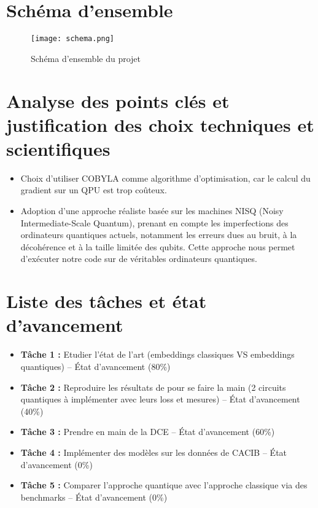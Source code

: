 \documentclass[11pt,a4paper]{article}
\begin{document}
\section{Schéma d'ensemble}
\begin{figure}[h!]
    \centering
    \texttt{[image: schema.png]}
    \caption{Schéma d'ensemble du projet}
    \label{fig:schema}
\end{figure}

\section{Analyse des points clés et justification des choix techniques et scientifiques}

\begin{itemize}
    \item Choix d’utiliser COBYLA comme algorithme d’optimisation, car le calcul du gradient sur un QPU est trop coûteux.
    \item Adoption d'une approche réaliste basée sur les machines NISQ (Noisy Intermediate-Scale Quantum), prenant en compte les imperfections des ordinateurs quantiques actuels, notamment les erreurs dues au bruit, à la décohérence et à la taille limitée des qubits. Cette approche nous permet d'exécuter notre code sur de véritables ordinateurs quantiques.
\end{itemize}

\section{Liste des tâches et état d'avancement}

\begin{itemize}
    \item \textbf{Tâche 1 :} Etudier l'état de l'art (embeddings classiques VS embeddings quantiques) -- État d'avancement (80\%)
    \item \textbf{Tâche 2 :} Reproduire les résultats de \cite{1} pour se faire la main (2 circuits quantiques à implémenter avec leurs loss et mesures) -- État d'avancement (40\%)
    \item \textbf{Tâche 3 :} Prendre en main de la DCE -- État d'avancement (60\%)
    \item \textbf{Tâche 4 :} Implémenter des modèles sur les données de CACIB -- État d'avancement (0\%)
    \item \textbf{Tâche 5 :} Comparer l'approche quantique avec l'approche classique via des benchmarks -- État d'avancement (0\%)
\end{itemize}
\end{document}
